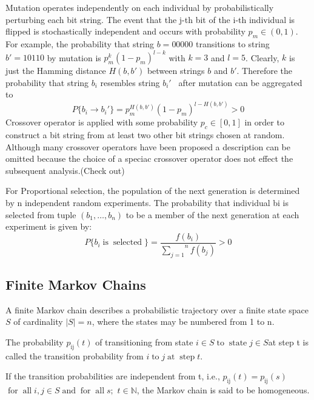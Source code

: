 \documentclass{article}
\newcommand{\tmop}[1]{\ensuremath{\operatorname{#1}}}
\begin{document}
{\color[HTML]{AAAAFF}Mutation} operates independently on each individual by
probabilistically perturbing each bit string. The event that the j-th bit of
the i-th individual is flipped is stochastically independent and occurs with
probability $p_m \in (0, 1)$. For example, the probability that string $b =
00000$ transitions to string $b' = 10110$ by mutation is $p_m^k (1 - p_m)^{l -
k}$ with $k = 3$ and $l = 5$. Clearly, $k$ is just the Hamming distance $H (b,
b')$ between strings $b$ and $b'$. Therefore the probability that string $b_i$
resembles string $b_i'$ \ after mutation can be aggregated to
\begin{equation}
  P \{ b_i \rightarrow b_i' \} = p_m^{H (b, b')} (1 - p_m)^{l - H (b, b')} > 0
\end{equation}
{\color[HTML]{AAAAFF}Crossover} operator is applied with some probability $p_c
\in [0, 1]$ in order to construct a bit string from at least two other bit
strings chosen at random. Although many crossover operators have been proposed
a description can be omitted because the choice of a speciac crossover
operator does not effect the subsequent analysis.(Check out)

For {\color[HTML]{AAAAFF}Proportional selection}, the population of the next
generation is determined by n independent random experiments. The probability
that individual bi is selected from tuple $(b_1, \ldots, b_n)$ to be a member
of the next generation at each experiment is given by:
\begin{equation}
  P \{ b_i \tmop{is} \tmop{selected} \} = \frac{f
  (b_i)}{\overset{n}{\underset{j = 1}{\sum}} f (b_j)} > 0
\end{equation}

\subsection{Finite Markov Chains}

A finite Markov chain describes a probabilistic trajectory over a finite state
space $S$ of cardinality $| S | = n$, where the states may be numbered from 1
to n.

The probability $p_{\tmop{ij}} (t)$ of transitioning from state $i \in S
\tmop{to} \tmop{state} j \in S$at step t is called the transition probability
from $i \tmop{to} j \tmop{at} \tmop{step} t$.

If the transition probabilities are independent from t, i.e., $p_{\tmop{ij}}
(t) = p_{\tmop{ij}} (s)$ $\tmop{for} \tmop{all} i, j \in S \tmop{and}
\tmop{for} \tmop{all} s ;$ $t \in \mathbb{N}$, the Markov chain is said to be
homogeneous.
\end{document}

